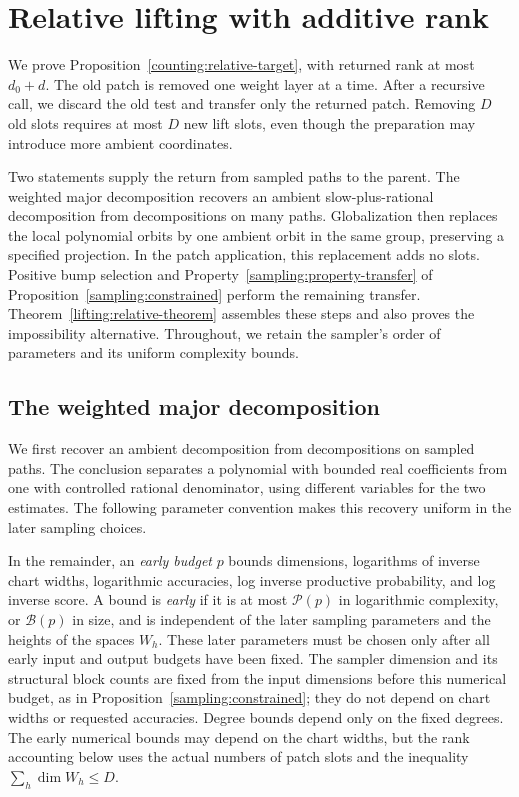 \section{Relative lifting with additive rank}
\label{lifting:section}

We prove Proposition~\ref{counting:relative-target}, with returned rank
at most $d_0+d$.  The old patch is removed one weight layer at a time.
After a recursive call, we discard the old test and transfer only the
returned patch.  Removing $D$ old slots requires at most $D$ new lift
slots, even though the preparation may introduce more ambient coordinates.

Two statements supply the return from sampled paths to the parent.
The weighted major decomposition recovers an ambient slow-plus-rational
decomposition from decompositions on many paths.  Globalization then
replaces the local polynomial orbits by one ambient orbit in the same
group, preserving a specified projection.  In the patch application,
this replacement adds no slots.  Positive bump selection and
Property~\ref{sampling:property-transfer} of
Proposition~\ref{sampling:constrained} perform the remaining transfer.
Theorem~\ref{lifting:relative-theorem} assembles these steps and also
proves the impossibility alternative.  Throughout, we retain the
sampler's order of parameters and its uniform complexity bounds.

\subsection{The weighted major decomposition}

We first recover an ambient decomposition from decompositions on sampled
paths.  The conclusion separates a polynomial with bounded real
coefficients from one with controlled rational denominator, using
different variables for the two estimates.  The following parameter
convention makes this recovery uniform in the later sampling choices.

In the remainder, an \emph{early budget} $p$ bounds dimensions,
logarithms of inverse chart widths, logarithmic accuracies, log inverse
productive probability, and log inverse score.  A bound is \emph{early} if it is at most
$\mathcal P(p)$ in logarithmic complexity, or $\mathcal B(p)$ in
size, and is independent of the later sampling parameters and the
heights of the spaces $W_h$.  These later parameters must be chosen
only after all early input and output budgets have been fixed.
The sampler dimension and its structural block counts are fixed from
the input dimensions before this numerical budget, as in
Proposition~\ref{sampling:constrained}; they do not depend on chart
widths or requested accuracies.  Degree bounds depend only on the
fixed degrees.  The early numerical bounds may depend on the chart
widths, but the rank accounting below uses the actual numbers of
patch slots and the inequality $\sum_h\dim W_h\le D$.

